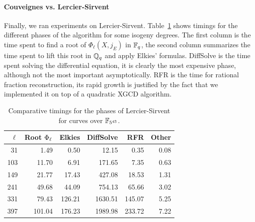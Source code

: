 \paragraph{Couveignes vs. Lercier-Sirvent}
Finally, we ran experiments on Lercier-Sirvent. Table~\ref{tab:ls}
shows timings for the different phases of the algorithm for some
isogeny degrees. The first column is the time spent to find a root of
$\Phi_\ell(X,j_E)$ in $\mathbb{F}_q$, the second column summarizes the time
spent to lift this root in $\mathbb{Q}_q$ and apply Elkies'
formulas. DiffSolve is the time spent solving the differential
equation, it is clearly the most expensive phase, although not the
most important asymptotically. RFR is the time for rational fraction
reconstruction, its rapid growth is justified by the fact that we
implemented it on top of a quadratic XGCD algorithm.

\begin{table}[ht]
  \centering
  \begin{tabular}{r r r r r r}
    \hline
    $\ell$ & Root $\Phi_\ell$ & Elkies & DiffSolve & RFR & Other\\
    \hline
    31&1.49&0.50&12.15&0.35&0.08\\
    103&11.70&6.91&171.65&7.35&0.63\\
    149&21.77&17.43&427.08&18.53&1.31\\
    241&49.68&44.09&754.13&65.66&3.02\\
    331&79.43&126.21&1630.51&145.07&5.25\\
    397&101.04&176.23&1989.98&233.72&7.22\\
    \hline
  \end{tabular}
  \caption{Comparative timings for the phases of Lercier-Sirvent for curves over $\mathbb{F}_{5^{43}}$.}
  \label{tab:ls}
\end{table}


